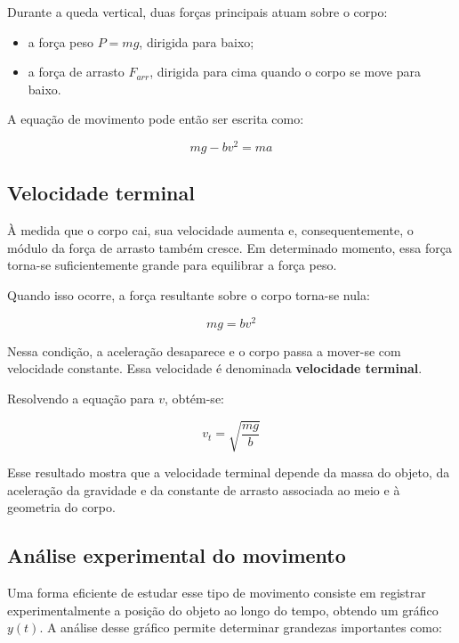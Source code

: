 \documentclass[a4paper,12pt]{article}
\begin{document}
Durante a queda vertical, duas forças principais atuam sobre o corpo:

\begin{itemize}
\item a força peso \(P = mg\), dirigida para baixo;
\item a força de arrasto \(F_{arr}\), dirigida para cima quando o corpo se move para baixo.
\end{itemize}

A equação de movimento pode então ser escrita como:

\begin{equation}
mg - bv^2 = ma
\end{equation}

\subsection*{Velocidade terminal}

À medida que o corpo cai, sua velocidade aumenta e, consequentemente, o módulo da força de arrasto também cresce. Em determinado momento, essa força torna-se suficientemente grande para equilibrar a força peso.

Quando isso ocorre, a força resultante sobre o corpo torna-se nula:

\begin{equation}
mg = bv^2
\end{equation}

Nessa condição, a aceleração desaparece e o corpo passa a mover-se com velocidade constante. Essa velocidade é denominada \textbf{velocidade terminal}.

Resolvendo a equação para \(v\), obtém-se:

\begin{equation}
v_t = \sqrt{\frac{mg}{b}}
\end{equation}

Esse resultado mostra que a velocidade terminal depende da massa do objeto, da aceleração da gravidade e da constante de arrasto associada ao meio e à geometria do corpo.

\subsection*{Análise experimental do movimento}

Uma forma eficiente de estudar esse tipo de movimento consiste em registrar experimentalmente a posição do objeto ao longo do tempo, obtendo um gráfico \(y(t)\). A análise desse gráfico permite determinar grandezas importantes como:
\end{document}
